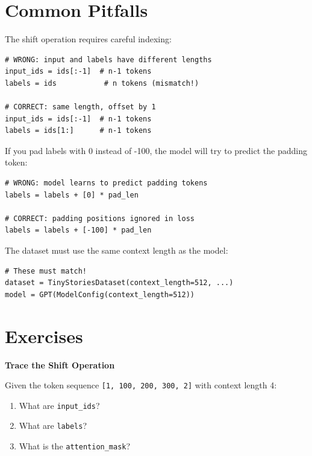 \section{Common Pitfalls}

\begin{pitfall}[title=Off-by-One Errors]
The shift operation requires careful indexing:
\begin{lstlisting}[style=python]
# WRONG: input and labels have different lengths
input_ids = ids[:-1]  # n-1 tokens
labels = ids           # n tokens (mismatch!)

# CORRECT: same length, offset by 1
input_ids = ids[:-1]  # n-1 tokens
labels = ids[1:]      # n-1 tokens
\end{lstlisting}
\end{pitfall}

\begin{pitfall}[title=Forgetting -100 for Padding]
If you pad labels with 0 instead of -100, the model will try to predict the padding token:
\begin{lstlisting}[style=python]
# WRONG: model learns to predict padding tokens
labels = labels + [0] * pad_len

# CORRECT: padding positions ignored in loss
labels = labels + [-100] * pad_len
\end{lstlisting}
\end{pitfall}

\begin{pitfall}[title=Inconsistent Context Length]
The dataset must use the same context length as the model:
\begin{lstlisting}[style=python]
# These must match!
dataset = TinyStoriesDataset(context_length=512, ...)
model = GPT(ModelConfig(context_length=512))
\end{lstlisting}
\end{pitfall}

\section{Exercises}

\begin{exercise}
\textbf{Trace the Shift Operation}

Given the token sequence \texttt{[1, 100, 200, 300, 2]} with context length 4:
\begin{enumerate}
    \item What are \texttt{input\_ids}?
    \item What are \texttt{labels}?
    \item What is the \texttt{attention\_mask}?
\end{enumerate}
\end{exercise}

